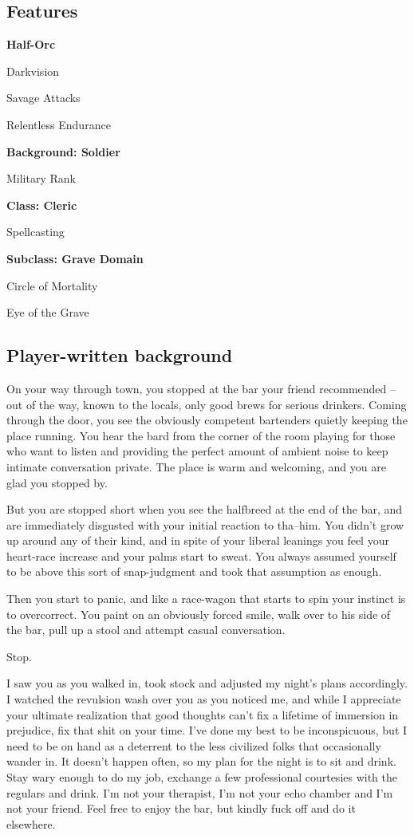 \subsection*{Features}\vspace{-6pt}
\quad\enspace
\textbf{Half-Orc} \par
\qquad Darkvision \par
\qquad Savage Attacks \par
\qquad Relentless Endurance \par
\textbf{Background: Soldier} \par
\qquad Military Rank \par
\textbf{Class: Cleric} \par
\qquad Spellcasting \par
\textbf{Subclass: Grave Domain} \par
\qquad Circle of Mortality \par
\qquad Eye of the Grave

\subsection{Player-written background}

On your way through town, you stopped at the bar your friend recommended -- out of the way, known to the locals, only good brews for serious drinkers.
Coming through the door, you see the obviously competent bartenders quietly keeping the place running.
You hear the bard from the corner of the room playing for those who want to listen and providing the perfect amount of ambient noise to keep intimate conversation private.
The place is warm and welcoming, and you are glad you stopped by.

But you are stopped short when you see the halfbreed at the end of the bar, and are immediately disgusted with your initial reaction to tha--him.
You didn't grow up around any of their kind, and in spite of your liberal leanings you feel your heart-race increase and your palms start to sweat.
You always assumed yourself to be above this sort of snap-judgment and took that assumption as enough.

Then you start to panic, and like a race-wagon that starts to spin your instinct is to overcorrect.
You paint on an obviously forced smile, walk over to his side of the bar, pull up a stool and attempt casual conversation.

Stop.

\hrulefill

I saw you as you walked in, took stock and adjusted my night's plans accordingly.
I watched the revulsion wash over you as you noticed me, and while I appreciate your ultimate realization that good thoughts can't fix a lifetime of immersion in prejudice, fix that shit on your time.
I've done my best to be inconspicuous, but I need to be on hand as a deterrent to the less civilized folks that occasionally wander in.
It doesn't happen often, so my plan for the night is to sit and drink.
Stay wary enough to do my job, exchange a few professional courtesies with the regulars and drink.
I'm not your therapist, I'm not your echo chamber and I'm not your friend.
Feel free to enjoy the bar, but kindly fuck off and do it elsewhere.

